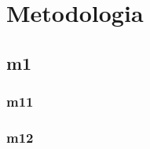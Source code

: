 \chapter{Metodologia}
\thispagestyle{empty}

\section{m1}

\subsection{m11}


\newpage
\subsection{m12}
